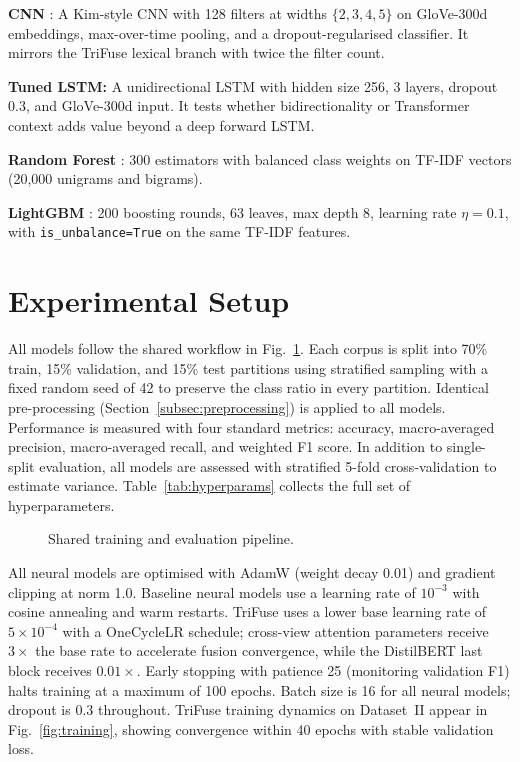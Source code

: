 \documentclass[10pt,twocolumn,a4paper]{article}
\begin{document}
\textbf{CNN} \citep{ref7}: A Kim-style CNN with 128 filters at widths $\{2,3,4,5\}$ on GloVe-300d embeddings, max-over-time pooling, and a dropout-regularised classifier. It mirrors the TriFuse lexical branch with twice the filter count.

\textbf{Tuned LSTM:} A unidirectional LSTM with hidden size 256, 3 layers, dropout 0.3, and GloVe-300d input. It tests whether bidirectionality or Transformer context adds value beyond a deep forward LSTM.

\textbf{Random Forest} \citep{ref5}: 300 estimators with balanced class weights on TF-IDF vectors (20,000 unigrams and bigrams).

\textbf{LightGBM} \citep{ref6}: 200 boosting rounds, 63 leaves, max depth 8, learning rate $\eta{=}0.1$, with \texttt{is\_unbalance=True} on the same TF-IDF features.

\section{Experimental Setup}\label{sec:setup}

All models follow the shared workflow in Fig.~\ref{fig:pipeline}. Each corpus is split into 70\% train, 15\% validation, and 15\% test partitions using stratified sampling with a fixed random seed of 42 to preserve the class ratio in every partition. Identical pre-processing (Section~\ref{subsec:preprocessing}) is applied to all models. Performance is measured with four standard metrics: accuracy, macro-averaged precision, macro-averaged recall, and weighted F1 score. In addition to single-split evaluation, all models are assessed with stratified 5-fold cross-validation to estimate variance. Table~\ref{tab:hyperparams} collects the full set of hyperparameters.

\begin{figure}[!t]
\centering

\caption{Shared training and evaluation pipeline.}
\label{fig:pipeline}
\end{figure}

All neural models are optimised with AdamW \citep{ref25} (weight decay 0.01) and gradient clipping at norm 1.0. Baseline neural models use a learning rate of $10^{-3}$ with cosine annealing and warm restarts. TriFuse uses a lower base learning rate of $5{\times}10^{-4}$ with a OneCycleLR schedule; cross-view attention parameters receive $3\times$ the base rate to accelerate fusion convergence, while the DistilBERT last block receives $0.01\times$. Early stopping with patience 25 (monitoring validation F1) halts training at a maximum of 100 epochs. Batch size is 16 for all neural models; dropout is 0.3 throughout. TriFuse training dynamics on Dataset~II appear in Fig.~\ref{fig:training}, showing convergence within 40 epochs with stable validation loss.
\end{document}
